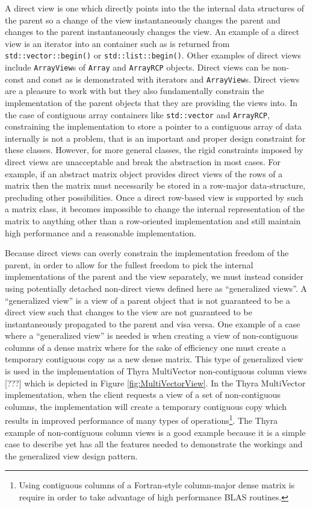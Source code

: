 \documentclass[pdf,ps2pdf,11pt]{SANDreport}
\begin{document}
A direct view is one which directly points into the the internal data
structures of the parent so a change of the view instantaneously
changes the parent and changes to the parent instantaneously changes
the view.  An example of a direct view is an iterator into an
container such as is returned from {}\texttt{std::vector::begin()} or
{}\texttt{std::list::begin()}.  Other examples of direct views include
{}\texttt{ArrayView}s of {}\texttt{Array} and {}\texttt{ArrayRCP}
objects.  Direct views can be non-const and const as is demonstrated
with iterators and {}\texttt{ArrayView}s.  Direct views are a pleasure
to work with but they also fundamentally constrain the implementation
of the parent objects that they are providing the views into.  In the
case of contiguous array containers like {}\texttt{std::vector} and
{}\texttt{ArrayRCP}, constraining the implementation to store a
pointer to a contiguous array of data internally is not a problem,
that is an important and proper design constraint for these classes.
However, for more general classes, the rigid constraints imposed by
direct views are unacceptable and break the abstraction in most cases.
For example, if an abstract matrix object provides direct views of the
rows of a matrix then the matrix must necessarily be stored in a
row-major data-structure, precluding other possibilities.  Once a
direct row-based view is supported by such a matrix class, it becomes
impossible to change the internal representation of the matrix to
anything other than a row-oriented implementation and still maintain
high performance and a reasonable implementation.

Because direct views can overly constrain the implementation freedom
of the parent, in order to allow for the fullest freedom to pick the
internal implementations of the parent and the view separately, we must
instead consider using potentially detached non-direct views defined
here as ``generalized views''.  A ``generalized view'' is a view of a
parent object that is not guaranteed to be a direct view such that
changes to the view are not guaranteed to be instantaneously
propagated to the parent and visa versa.  One example of a case where
a ``generalized view'' is needed is when creating a view of
non-contiguous columns of a dense matrix where for the sake of
efficiency one must create a temporary contiguous copy as a new dense
matrix.  This type of generalized view is used in the implementation
of Thyra MultiVector non-contiguous column views [???] which is
depicted in Figure {}\ref{fig:MultiVectorView}. In the Thyra
MultiVector implementation, when the client requests a view of a set
of non-contiguous columns, the implementation will create a temporary
contiguous copy which results in improved performance of many types of
operations\footnote{Using contiguous columns of a Fortran-style
column-major dense matrix is require in order to take advantage of
high performance BLAS routines.}.  The Thyra example of non-contiguous
column views is a good example because it is a simple case to describe
yet has all the features needed to demonstrate the workings and the
generalized view design pattern.
\end{document}
